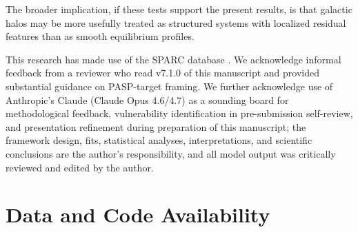 \documentclass[linenumbers]{aastex701}
\begin{document}
The broader implication, if these tests support the present results, is that galactic halos may be more usefully treated as structured systems with localized residual features than as smooth equilibrium profiles.


\begin{acknowledgments}
This research has made use of the SPARC database \citep{Lelli2016}. We acknowledge informal feedback from a reviewer who read v7.1.0 of this manuscript and provided substantial guidance on PASP-target framing. We further acknowledge use of Anthropic's Claude (Claude Opus 4.6/4.7) as a sounding board for methodological feedback, vulnerability identification in pre-submission self-review, and presentation refinement during preparation of this manuscript; the framework design, fits, statistical analyses, interpretations, and scientific conclusions are the author's responsibility, and all model output was critically reviewed and edited by the author.
\end{acknowledgments}



\section*{Data and Code Availability}\label{sec:dataavail}
\end{document}
